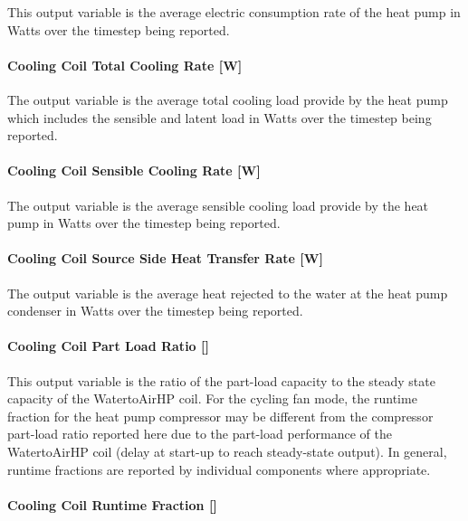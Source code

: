 This output variable is the average electric consumption rate of the heat pump in Watts over the timestep being reported.

\paragraph{Cooling Coil Total Cooling Rate {[}W{]}}\label{cooling-coil-total-cooling-rate-w-8}

The output variable is the average total cooling load provide by the heat pump which includes the sensible and latent load in Watts over the timestep being reported.

\paragraph{Cooling Coil Sensible Cooling Rate {[}W{]}}\label{cooling-coil-sensible-cooling-rate-w-8}

The output variable is the average sensible cooling load provide by the heat pump in Watts over the timestep being reported.

\paragraph{Cooling Coil Source Side Heat Transfer Rate {[}W{]}}\label{cooling-coil-source-side-heat-transfer-rate-w-1}

The output variable is the average heat rejected to the water at the heat pump condenser in Watts over the timestep being reported.

\paragraph{Cooling Coil Part Load Ratio {[]}}\label{cooling-coil-part-load-ratio-1}

This output variable is the ratio of the part-load capacity to the steady state capacity of the WatertoAirHP coil. For the cycling fan mode, the runtime fraction for the heat pump compressor may be different from the compressor part-load ratio reported here due to the part-load performance of the WatertoAirHP coil (delay at start-up to reach steady-state output). In general, runtime fractions are reported by individual components where appropriate.

\paragraph{Cooling Coil Runtime Fraction {[]}}\label{cooling-coil-runtime-fraction-6}


